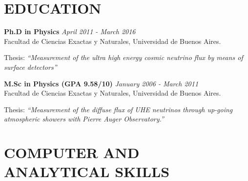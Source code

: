 \documentclass[letterpaper]{article}
\renewenvironment{itemize}{
  \begin{list}{}{
    \setlength{\leftmargin}{1.5em}
  }
}{
  \end{list}
}
\begin{document}
\section*{EDUCATION}
\begin{itemize}
 \item \textbf{Ph.D in Physics} \hfill \emph{April 2011 - March 2016} \\
 Facultad de Ciencias Exactas y Naturales, Universidad de Buenos Aires.
 \item Thesis: \emph{``Measurement of the ultra high energy cosmic neutrino flux by means of surface detectors''}\\
 \vspace*{2mm}
 \item \textbf{M.Sc in Physics (GPA 9.58/10)} \hfill \emph{January 2006 - March 2011} \\
 Facultad de Ciencias Exactas y Naturales, Universidad de Buenos Aires.
 \item Thesis: \emph{``Measurement of the diffuse flux of UHE neutrinos through up-going atmospheric showers with Pierre Auger Observatory.''}
\end{itemize}


\section*{COMPUTER AND ANALYTICAL SKILLS}
\end{document}
